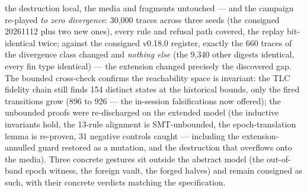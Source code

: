 \documentclass[11pt,a4paper]{article}
\begin{document}
the destruction local, the media and fragments untouched --- and the
campaign re-played \emph{to zero divergence}: 30{,}000 traces across
three seeds (the consigned 20261112 plus two new ones), every rule and
refusal path covered, the replay bit-identical twice; against the
consigned v0.18.0 register, exactly the 660 traces of the divergence
class changed and \emph{nothing else} (the 9{,}340 other digests
identical, every fin type identical) --- the extension changed
precisely the discovered gap. The bounded cross-check confirms the
reachability space is invariant: the TLC fidelity chain still finds
154 distinct states at the historical bounds, only the fired
transitions grow (896 to 926 --- the in-session falsifications now
offered); the unbounded proofs were re-discharged on the extended
model (the inductive invariants hold, the 13-rule alignment is
SMT-unbounded, the epoch-translation lemma is re-proven, 31 negative
controls caught --- including the extension-annulled guard restored
as a mutation, and the destruction that overflows onto the media). Three concrete gestures sit outside the abstract model
(the out-of-band epoch witness, the foreign vault, the forged halves)
and remain consigned as such, with their concrete verdicts matching
the specification.
\end{document}
